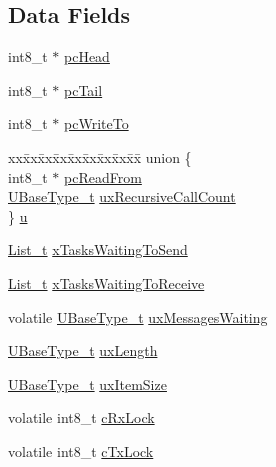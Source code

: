 \subsection*{Data Fields}
\begin{DoxyCompactItemize}
\item 
int8\+\_\+t $\ast$ \hyperlink{structQueueDefinition_a487dc7e43b380c58212cba72bc33e0ed}{pc\+Head}
\item 
int8\+\_\+t $\ast$ \hyperlink{structQueueDefinition_a189dc1b16fc2152dd9441ea1a117b0ce}{pc\+Tail}
\item 
int8\+\_\+t $\ast$ \hyperlink{structQueueDefinition_abdf13cc013c8488848cee3fce4f0fed3}{pc\+Write\+To}
\item 
\begin{tabbing}
xx\=xx\=xx\=xx\=xx\=xx\=xx\=xx\=xx\=\kill
union \{\\
\>int8\_t $\ast$ \hyperlink{structQueueDefinition_a970cf73ab9c7382b581bc310b1d947d5}{pcReadFrom}\\
\>\hyperlink{portmacro_8h_a646f89d4298e4f5afd522202b11cb2e6}{UBaseType\_t} \hyperlink{structQueueDefinition_a2cf88e286477f6f89fe1009d722dc4cf}{uxRecursiveCallCount}\\
\} \hyperlink{structQueueDefinition_a7a884f0f93e700e55aa0f24c1ba2d761}{u}\\

\end{tabbing}\item 
\hyperlink{list_8h_afd590ef6400071b4d63d65ef90bea7f4}{List\+\_\+t} \hyperlink{structQueueDefinition_aaab135c4345cb0393d6ff3cd5164c7b2}{x\+Tasks\+Waiting\+To\+Send}
\item 
\hyperlink{list_8h_afd590ef6400071b4d63d65ef90bea7f4}{List\+\_\+t} \hyperlink{structQueueDefinition_af6d61526f77beee659cd604a0c473359}{x\+Tasks\+Waiting\+To\+Receive}
\item 
volatile \hyperlink{portmacro_8h_a646f89d4298e4f5afd522202b11cb2e6}{U\+Base\+Type\+\_\+t} \hyperlink{structQueueDefinition_a12b07a40152d0f21488ca06d362d13d1}{ux\+Messages\+Waiting}
\item 
\hyperlink{portmacro_8h_a646f89d4298e4f5afd522202b11cb2e6}{U\+Base\+Type\+\_\+t} \hyperlink{structQueueDefinition_ae80d17a812c669d4d41265b7f693988c}{ux\+Length}
\item 
\hyperlink{portmacro_8h_a646f89d4298e4f5afd522202b11cb2e6}{U\+Base\+Type\+\_\+t} \hyperlink{structQueueDefinition_a81bb7d3826909244baa9debf5a55abb0}{ux\+Item\+Size}
\item 
volatile int8\+\_\+t \hyperlink{structQueueDefinition_ac750a3f75a6e174adbc697e473a0dd13}{c\+Rx\+Lock}
\item 
volatile int8\+\_\+t \hyperlink{structQueueDefinition_a24ac3f0707f098da2a22244d843fcf82}{c\+Tx\+Lock}
\end{DoxyCompactItemize}


